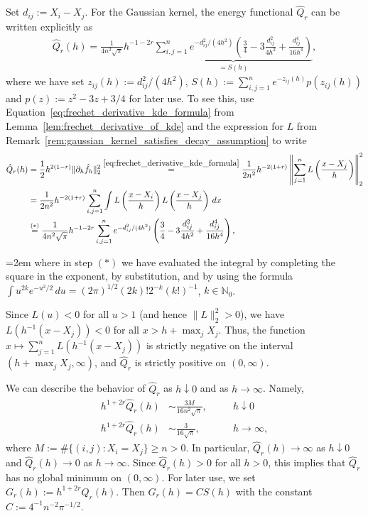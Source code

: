 Set $d_{ij}:=X_i-X_j$. For the Gaussian kernel, the energy functional $\hat{Q}_r$ can be written explicitly as
\begin{align}\label{eq:gaussian_energy_functional_formula}
    \hat{Q}_r(h)=\frac{1}{4n^2\sqrt{\pi}}h^{-1-2r}\underbrace{\sum_{i,j=1}^{n}e^{-d_{ij}^2/(4h^2)}\left(\frac{3}{4}-3\frac{d_{ij}^2}{4h^2}+\frac{d_{ij}^4}{16h^4}\right)}_{=S(h)},
\end{align}
where we have set $z_{ij}(h):=d_{ij}^2/(4h^2)$, $S(h):=\sum_{i,j=1}^{n}e^{-z_{ij}(h)}p(z_{ij}(h))$ and $p(z):=z^2-3z+3/4$ for later use. To see this, use Equation~\eqref{eq:frechet_derivative_kde_formula} from Lemma~\ref{lem:frechet_derivative_of_kde} and the expression for $L$ from Remark~\ref{rem:gaussian_kernel_satisfies_decay_assumption} to write
\begin{align*}
    \hat{Q}_r(h)&=\frac{1}{2}h^{2(1-r)}\|\partial_h\hat{f}_h\|_2^2\stackrel{\eqref{eq:frechet_derivative_kde_formula}}{=}\frac{1}{2n^2}h^{-2(1+r)}\left\|\sum_{j=1}^{n}L\left(\frac{x-X_j}{h}\right)\right\|_2^2\\&
    =\frac{1}{2n^2}h^{-2(1+r)}\sum_{i,j=1}^{n}\int L\left(\frac{x-X_i}{h}\right)L\left(\frac{x-X_j}{h}\right)\,dx\\&
    \stackrel{(\ast)}{=}\frac{1}{4n^2\sqrt{\pi}}h^{-1-2r}\sum_{i,j=1}^{n}e^{-d_{ij}^2/(4h^2)}\left(\frac{3}{4}-3\frac{d_{ij}^2}{4h^2}+\frac{d_{ij}^4}{16h^4}\right),
\end{align*}
{\emergencystretch=2em\relax
where in step $(\ast)$ we have evaluated the integral by completing the square in the exponent, by substitution, and by using the formula $\int u^{2k}e^{-u^2/2}\,du=(2\pi)^{1/2}(2k)!2^{-k}(k!)^{-1}$, $k\in\mathbb{N}_0$.
\par
}


Since $L(u)<0$ for all $u>1$ (and hence $\|L\|_2^2>0$), we have $L(h^{-1}(x-X_j))<0$ for all $x>h+\max_jX_j$. Thus, the function $x\mapsto \sum_{j=1}^{n}L(h^{-1}(x-X_j))$ is strictly negative on the interval $(h+\max_jX_j,\infty)$, and $\hat{Q}_r$ is strictly positive on $(0,\infty)$.

We can describe the behavior of $\hat{Q}_r$ as $h\downarrow0$ and as $h\to\infty$. Namely,
\begin{align*}
    h^{1+2r}\hat{Q}_r(h)&\sim\frac{3M}{16n^2\sqrt{\pi}},&&\quad h\downarrow0\\
    h^{1+2r}\hat{Q}_r(h)&\sim\frac{3}{16\sqrt{\pi}},&&\quad h\to\infty,
\end{align*}
where $M:=\#\{(i,j):X_i=X_j\}\ge n>0$. In particular, $\hat{Q}_r(h)\to\infty$ as $h\downarrow0$ and $\hat{Q}_r(h)\to0$ as $h\to\infty$. Since $\hat{Q}_r(h)>0$ for all $h>0$, this implies that $\hat{Q}_r$ has no global minimum on $(0,\infty)$. For later use, we set $G_r(h):=h^{1+2r}\hat{Q}_r(h)$. Then $G_r(h)=CS(h)$ with the constant $C:=4^{-1}n^{-2}\pi^{-1/2}$.

